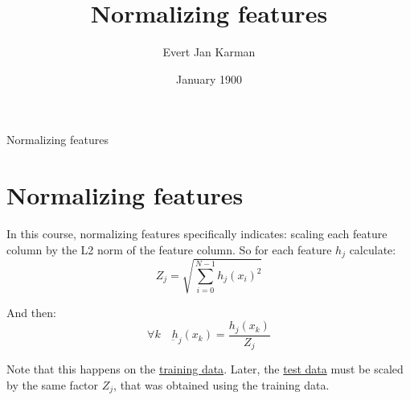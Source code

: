 \documentclass[12pt, letterpaper]{article}
\title{Normalizing features}
\author{Evert Jan Karman}
\date{January 1900}
\begin{document}
\maketitle

Normalizing features

\section{Normalizing features}
In this course, normalizing features specifically indicates: scaling each feature column by the L2 norm of the feature column.
So for each feature $h_{j}$ calculate:
\[
Z_{j} = \sqrt{\sum_{i=0}^{N-1} h_{j}(x_{i})^{2}}
\]

And then:
\[
\forall k \quad \underbar{h}_{j}(x_{k}) = \frac{h_{j}(x_{k})}{Z_{j}}
\]

Note that this happens on the \underline{training data}.
Later, the \underline{test data} must be scaled by the same factor $Z_{j}$, that was obtained using the training data.
\end{document}
